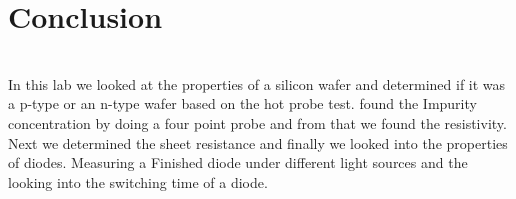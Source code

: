 \section{Conclusion}\\
In this lab we looked at the properties of a silicon wafer and determined if it was a p-type or an n-type wafer based on the hot probe test. found the Impurity concentration by doing a four point probe and from that we found the resistivity. Next we determined the sheet resistance and finally we looked into the properties of diodes. Measuring a Finished diode under different light sources and the looking into the switching time of a diode. 